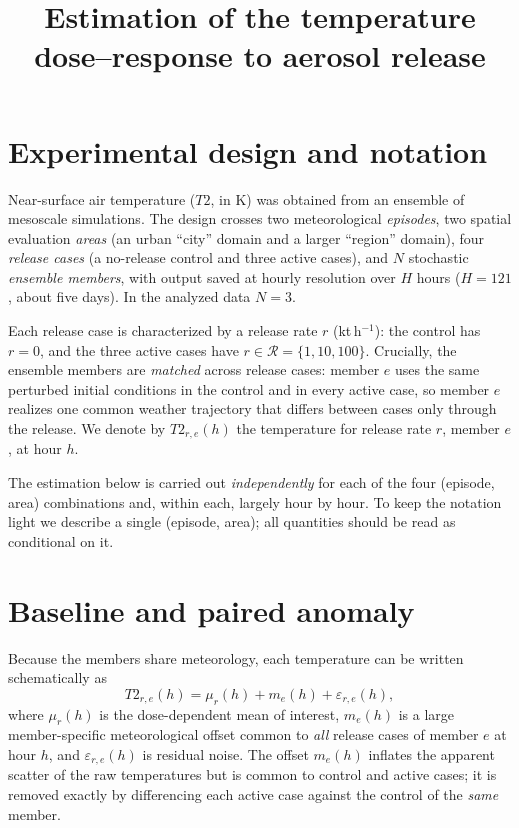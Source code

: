 \documentclass[11pt]{article}
\title{Estimation of the temperature dose--response to aerosol release}
\author{}
\date{}
\begin{document}
\maketitle

\section{Experimental design and notation}

Near-surface air temperature ($T2$, in K) was obtained from an ensemble of
mesoscale simulations. The design crosses two meteorological \emph{episodes},
two spatial evaluation \emph{areas} (an urban ``city'' domain and a larger
``region'' domain), four \emph{release cases} (a no-release control and three
active cases), and $N$ stochastic \emph{ensemble members}, with output saved at
hourly resolution over $H$ hours ($H=121$, about five days). In the analyzed
data $N=3$.

Each release case is characterized by a release rate $r$ (kt\,h$^{-1}$): the
control has $r=0$, and the three active cases have $r\in\mathcal{R}=\{1,10,100\}$.
Crucially, the ensemble members are \emph{matched} across release cases: member
$e$ uses the same perturbed initial conditions in the control and in every active
case, so member $e$ realizes one common weather trajectory that differs between
cases only through the release. We denote by $T2_{r,e}(h)$ the temperature for
release rate $r$, member $e$, at hour $h$.

The estimation below is carried out \emph{independently} for each of the four
(episode, area) combinations and, within each, largely hour by hour. To keep the
notation light we describe a single (episode, area); all quantities should be read
as conditional on it.

\section{Baseline and paired anomaly}

Because the members share meteorology, each temperature can be written
schematically as
\begin{equation}
  T2_{r,e}(h) = \mu_r(h) + m_e(h) + \varepsilon_{r,e}(h),
  \label{eq:decomp}
\end{equation}
where $\mu_r(h)$ is the dose-dependent mean of interest, $m_e(h)$ is a large
member-specific meteorological offset common to \emph{all} release cases of member
$e$ at hour $h$, and $\varepsilon_{r,e}(h)$ is residual noise. The offset $m_e(h)$
inflates the apparent scatter of the raw temperatures but is common to control and
active cases; it is removed exactly by differencing each active case against the
control of the \emph{same} member.
\end{document}
